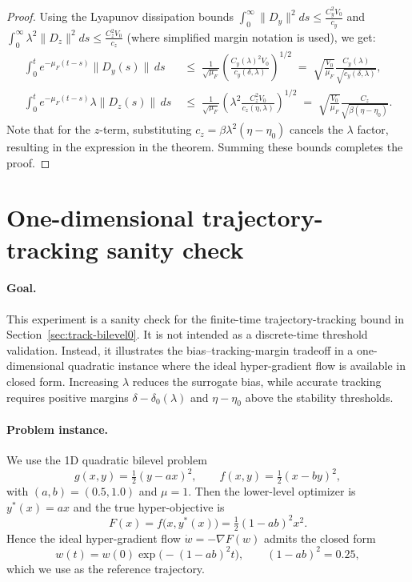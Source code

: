 \documentclass{article}
\newcommand{\1}{\mathbf{1}}
\begin{document}
\begin{proof}
    Using the Lyapunov dissipation bounds $\int_0^\infty \|D_y\|^2 ds \le \frac{C_y^2 V_0}{c_y}$ and $\int_0^\infty \lambda^2 \|D_z\|^2 ds \le \frac{C_z^2 V_0}{c_z}$ (where simplified margin notation is used), we get:
    \begin{align*}
        \int_0^t e^{-\mu_F(t-s)} \|D_y(s)\| \, ds 
        \;&\le\; \frac{1}{\sqrt{\mu_F}} \left( \frac{C_y(\lambda)^2 V_0}{c_y(\delta,\lambda)} \right)^{1/2} 
        \;=\; \sqrt{\frac{V_0}{\mu_F}} \frac{C_y(\lambda)}{\sqrt{c_y(\delta,\lambda)}}, \\
        \int_0^t e^{-\mu_F(t-s)} \lambda \|D_z(s)\| \, ds 
        \;&\le\; \frac{1}{\sqrt{\mu_F}} \left( \lambda^2 \frac{C_z^2 V_0}{c_z(\eta,\lambda)} \right)^{1/2} 
        \;=\; \sqrt{\frac{V_0}{\mu_F}} \frac{C_z}{\sqrt{\beta(\eta - \eta_0)}}.
    \end{align*}
    Note that for the $z$-term, substituting $c_z = \beta \lambda^2 (\eta-\eta_0)$ cancels the $\lambda$ factor, resulting in the expression in the theorem. Summing these bounds completes the proof.
\end{proof} 



\section{One-dimensional trajectory-tracking sanity check}\label{app:exp2}

\paragraph{Goal.}
This experiment is a sanity check for the finite-time trajectory-tracking bound in
Section~\ref{sec:track-bilevel0}. It is not intended as a discrete-time threshold
validation. Instead, it illustrates the bias--tracking-margin tradeoff in a
one-dimensional quadratic instance where the ideal hyper-gradient flow is
available in closed form. Increasing $\lambda$ reduces the surrogate bias, while
accurate tracking requires positive margins
$\delta-\delta_0(\lambda)$ and $\eta-\eta_0$ above the stability
thresholds.

\paragraph{Problem instance.}
We use the 1D quadratic bilevel problem
\[
g(x,y)=\tfrac12(y-ax)^2,\qquad f(x,y)=\tfrac12(x-by)^2,
\]
with $(a,b)=(0.5,1.0)$ and $\mu=1$.
Then the lower-level optimizer is $y^*(x)=ax$ and the true hyper-objective is
\[
F(x)=f\bigl(x,y^*(x)\bigr)=\tfrac12(1-ab)^2x^2.
\]
Hence the ideal hyper-gradient flow $\dot w=-\nabla F(w)$ admits the closed form
\[
w(t)=w(0)\exp\!\bigl(-(1-ab)^2 t\bigr),\qquad (1-ab)^2=0.25,
\]
which we use as the reference trajectory.
\end{document}
